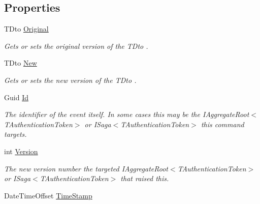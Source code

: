 \subsection*{Properties}
\begin{DoxyCompactItemize}
\item 
T\+Dto \hyperlink{classCqrs_1_1Events_1_1DtoAggregateEvent_a62b5fa272dfbe104d8f37500e3d5cc45_a62b5fa272dfbe104d8f37500e3d5cc45}{Original}
\begin{DoxyCompactList}\small\item\em Gets or sets the original version of the {\itshape T\+Dto} . \end{DoxyCompactList}\item 
T\+Dto \hyperlink{classCqrs_1_1Events_1_1DtoAggregateEvent_a702bd5605d7ce538b992c2d43198194c_a702bd5605d7ce538b992c2d43198194c}{New}
\begin{DoxyCompactList}\small\item\em Gets or sets the new version of the {\itshape T\+Dto} . \end{DoxyCompactList}\item 
Guid \hyperlink{classCqrs_1_1Events_1_1DtoAggregateEvent_ad5f763ecd79dc9b4882ed15239242d17_ad5f763ecd79dc9b4882ed15239242d17}{Id}
\begin{DoxyCompactList}\small\item\em The identifier of the event itself. In some cases this may be the I\+Aggregate\+Root$<$\+T\+Authentication\+Token$>$ or I\+Saga$<$\+T\+Authentication\+Token$>$ this command targets. \end{DoxyCompactList}\item 
int \hyperlink{classCqrs_1_1Events_1_1DtoAggregateEvent_a2c3a579eba3effd19cf0ae740ca33389_a2c3a579eba3effd19cf0ae740ca33389}{Version}
\begin{DoxyCompactList}\small\item\em The new version number the targeted I\+Aggregate\+Root$<$\+T\+Authentication\+Token$>$ or I\+Saga$<$\+T\+Authentication\+Token$>$ that raised this. \end{DoxyCompactList}\item 
Date\+Time\+Offset \hyperlink{classCqrs_1_1Events_1_1DtoAggregateEvent_a0acde01c4c3cf985f7fc170bc9658278_a0acde01c4c3cf985f7fc170bc9658278}{Time\+Stamp}

\end{DoxyCompactItemize}
